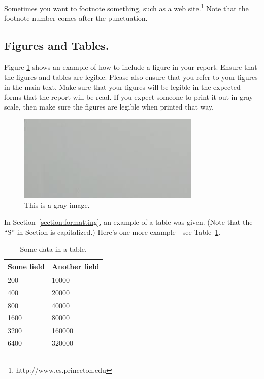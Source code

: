 \documentclass[pageno]{jpaper}
\begin{document}
Sometimes you want to footnote something, such as a web
site.\footnote{http://www.cs.princeton.edu}  Note that the footnote
number comes after the punctuation.

\subsection{Figures and Tables.}

Figure \ref{fig:gray} shows an example of how to include a figure in
your report.
Ensure that the figures and
tables are legible.  Please also ensure that you refer to your
figures in the main text. Make sure that your figures will be legible
in the expected forms that the report will be read.  If you expect someone
to print it out in gray-scale, then make sure the figures are legible
when printed that way.

\begin{figure}[hbt]
  \centering
  \includegraphics[width=0.75\linewidth]{gray.jpg}
  \caption{This is a gray image.}
  \label{fig:gray}
\end{figure}

In Section~\ref{section:formatting}, an example of a table was given.
(Note that the ``S'' in Section is capitalized.)  Here's one more
example - see Table~\ref{table:data}.

\begin{table}[hbt]
  \centering
  \begin{tabular}{|l|l|} \hline
    \textbf{Some field} & \textbf{Another field} \\\hline
    200                 & 10000                  \\ \hline
    400                 & 20000                  \\ \hline
    800                 & 40000                  \\ \hline
    1600                & 80000                  \\ \hline
    3200                & 160000                 \\ \hline
    6400                & 320000                 \\ \hline
  \end{tabular}
  \caption{Some data in a table. }
  \label{table:data}
\end{table}
\end{document}
